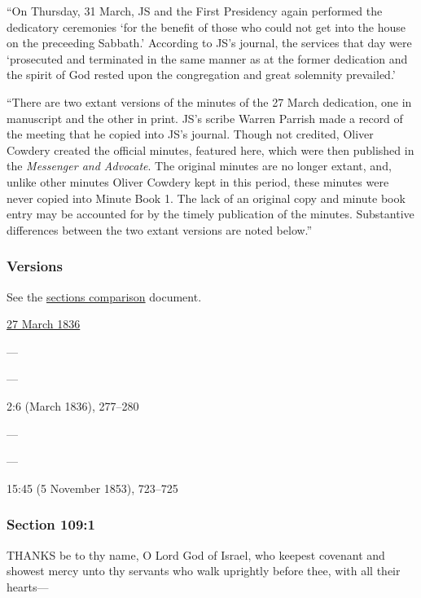 			``On Thursday, 31 March, JS and the First Presidency again performed the dedicatory ceremonies `for the benefit of those who could not get into the house on the preceeding Sabbath.' According to JS's journal, the services that day were `prosecuted and terminated in the same manner as at the former dedication and the spirit of God rested upon the congregation and great solemnity prevailed.'

			``There are two extant versions of the minutes of the 27 March dedication, one in manuscript and the other in print. JS's scribe Warren Parrish made a record of the meeting that he copied into JS's journal. Though not credited, Oliver Cowdery created the official minutes, featured here, which were then published in the \textit{Messenger and Advocate}. The original minutes are no longer extant, and, unlike other minutes Oliver Cowdery kept in this period, these minutes were never copied into Minute Book 1. The lack of an original copy and minute book entry may be accounted for by the timely publication of the minutes. Substantive differences between the two extant versions are noted below.''
					
	\subsubsection{Versions}
		\label{DC109-V}
		
		See the \href{https://drive.google.com/file/d/1goAvNz8jS4R8slYfMG_db55Ty2z_vmgK/view?usp=sharing}{sections comparison} document.
	
		\begin{compactdesc}
			\item[JSP] \hyperref[EMS-1836-JS-27-MAR-1836]{27 March 1836}
			\item[BC] ---
			\item[DC 1835] ---
			\item[MA] 2:6 (March 1836), 277--280
			\item[DC 1844] ---
			\item[TS] ---
			\item[MS] 15:45 (5 November 1853), 723--725
		\end{compactdesc}

	\subsubsection{Section 109:1} %
		\label{DC109-1}

		THANKS be to thy name, O Lord God of Israel, who keepest covenant and showest mercy unto thy servants who walk uprightly before thee, with all their hearts---

